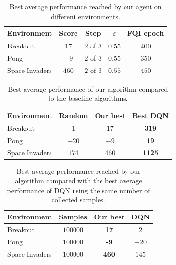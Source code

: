 %
\begin{table}
    \centering
    \begin{tabular}{l c c c c} 
	\hline
	Environment    & Score    & Step       & $\varepsilon$ & FQI epoch  \\ 
	\hline 
	Breakout       & $17$     & $2$ of $3$ & $0.55$        & $400$     \\
	Pong           & $-9$     & $2$ of $3$ & $0.55$        & $350$     \\
	Space Invaders & $460$    & $2$ of $3$ & $0.55$        & $450$     \\
	\hline
    \end{tabular}
    \caption[Performance of our algorithm]{Best average performance reached by 
	    our agent on different environments.}
    \label{t:avg_performance_only_ours}
\end{table}
%
%
\begin{table}
    \centering
    \begin{tabular}{l c c c} 
	\hline
	Environment    & Random   & Our best & Best DQN  \\ 
	\hline 
	Breakout       & $1$      & $17$     & \textbf{319}     \\
	Pong           & $-20$    & $-9$     & \textbf{19}      \\
	Space Invaders & $174$    & $460$    & \textbf{1125}    \\
	\hline
    \end{tabular}
    \caption[Performance of our algorithm w.r.t. the baselines]{Best average 
	     performance of our algorithm compared to the baseline algorithms.}
    \label{t:avg_performance_main}
\end{table}
%
%
\begin{table}
    \centering
    \begin{tabular}{l c c c} 
	\hline
	Environment    & Samples  & Our best      & DQN      \\
	\hline 
	Breakout       & $100000$ & \textbf{17}   & $2$    \\
	Pong           & $100000$ & \textbf{-9}   & $-20$ \\
	Space Invaders & $100000$ & \textbf{460}  & $145 $ \\
	\hline
    \end{tabular}
    \caption[Sample efficiency of our algorithm]{Best average performance 
	    reached by our algorithm compared with the best average performance
	    of DQN using the same number of collected samples.}
    \label{t:sample_efficiency_main}
\end{table}
%
    





